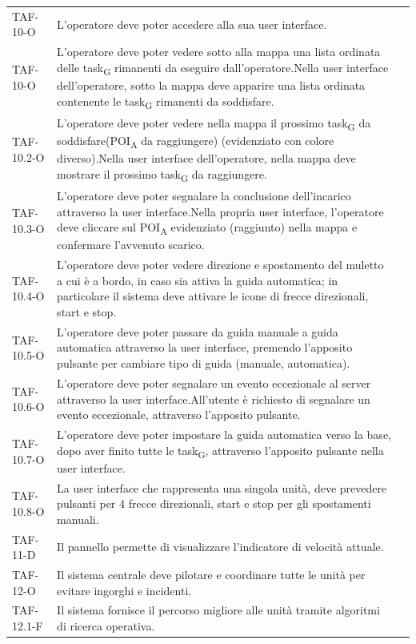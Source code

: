 \begin{longtable}{ >{\centering}p{} >{}p{}
		>{\centering}p{}}
	TAF-10-O & L'operatore deve poter accedere alla sua user interface.  & 0\tabularnewline
	TAF-10-O & L'operatore deve poter vedere sotto alla mappa una lista ordinata delle task\textsubscript{G} rimanenti da eseguire dall'operatore.\newline Nella user interface dell'operatore, sotto la mappa deve apparire una lista ordinata contenente le task\textsubscript{G} rimanenti da soddisfare. & 0\tabularnewline
	TAF-10.2-O & L'operatore deve poter vedere nella mappa il prossimo task\textsubscript{G} da soddisfare(POI\textsubscript{A} da raggiungere) (evidenziato con colore diverso).\newline Nella user interface dell'operatore, nella mappa deve mostrare il prossimo task\textsubscript{G} da raggiungere. & 0\tabularnewline
	TAF-10.3-O & L'operatore deve poter segnalare la conclusione dell'incarico attraverso la user interface.\newline Nella propria user interface, l'operatore deve cliccare sul POI\textsubscript{A} evidenziato (raggiunto) nella mappa e confermare l'avvenuto scarico. & 0\tabularnewline
	TAF-10.4-O & L'operatore deve poter vedere direzione e spostamento del muletto a cui è a bordo, in caso sia attiva la guida automatica; in particolare il sistema deve attivare le icone di frecce direzionali, start e stop.  & 0\tabularnewline
	TAF-10.5-O & L'operatore deve poter passare da guida manuale a guida automatica attraverso la user interface, premendo l'apposito pulsante per cambiare tipo di guida (manuale, automatica). & 0\tabularnewline
	TAF-10.6-O & L'operatore deve poter segnalare un evento eccezionale al server attraverso la user interface.\newline All'utente è richiesto di segnalare un evento eccezionale, attraverso l'apposito pulsante.& 0\tabularnewline
	TAF-10.7-O & L'operatore deve poter impostare la guida automatica verso la base, dopo aver finito tutte le task\textsubscript{G}, attraverso l'apposito pulsante nella user interface.& 0\tabularnewline
	TAF-10.8-O & La user interface che rappresenta una singola unità, deve prevedere pulsanti per 4 frecce direzionali, start e stop per gli spostamenti manuali. & 0\tabularnewline

	TAF-11-D & Il pannello permette di visualizzare l'indicatore di velocità attuale. & 0\tabularnewline

	TAF-12-O & Il sistema centrale deve pilotare e coordinare tutte le unità per evitare ingorghi e incidenti. & 0\tabularnewline
	TAF-12.1-F & Il sistema fornisce il percorso migliore alle unità tramite algoritmi di ricerca operativa. & 0\tabularnewline


\end{longtable}
